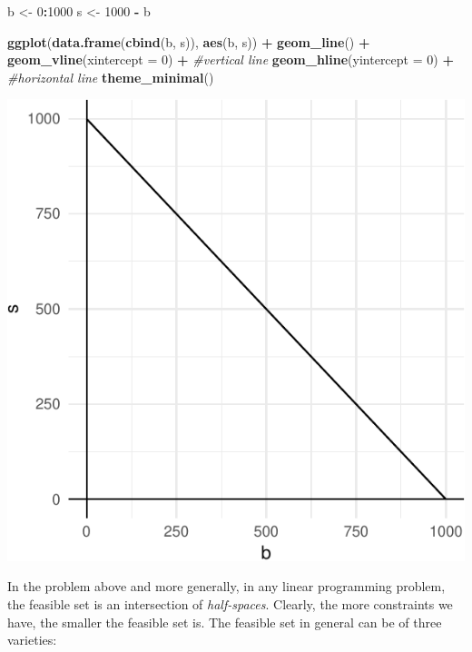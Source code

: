\documentclass[11pt,]{article}
\newenvironment{Shaded}{\begin{snugshade}}{\end{snugshade}}
\newcommand{\KeywordTok}[1]{\textcolor[rgb]{0.13,0.29,0.53}{\textbf{#1}}}
\newcommand{\DataTypeTok}[1]{\textcolor[rgb]{0.13,0.29,0.53}{#1}}
\newcommand{\DecValTok}[1]{\textcolor[rgb]{0.00,0.00,0.81}{#1}}
\newcommand{\StringTok}[1]{\textcolor[rgb]{0.31,0.60,0.02}{#1}}
\newcommand{\CommentTok}[1]{\textcolor[rgb]{0.56,0.35,0.01}{\textit{#1}}}
\newcommand{\OperatorTok}[1]{\textcolor[rgb]{0.81,0.36,0.00}{\textbf{#1}}}
\newcommand{\NormalTok}[1]{#1}
\begin{document}
\begin{Shaded}
\begin{Highlighting}[]
\NormalTok{b <-}\StringTok{ }\DecValTok{0}\OperatorTok{:}\DecValTok{1000}
\NormalTok{s <-}\StringTok{ }\DecValTok{1000} \OperatorTok{-}\StringTok{ }\NormalTok{b}

\KeywordTok{ggplot}\NormalTok{(}\KeywordTok{data.frame}\NormalTok{(}\KeywordTok{cbind}\NormalTok{(b, s)), }\KeywordTok{aes}\NormalTok{(b, s)) }\OperatorTok{+}
\StringTok{  }\KeywordTok{geom_line}\NormalTok{() }\OperatorTok{+}
\StringTok{  }\KeywordTok{geom_vline}\NormalTok{(}\DataTypeTok{xintercept =} \DecValTok{0}\NormalTok{) }\OperatorTok{+}\StringTok{ }\CommentTok{#vertical line}
\StringTok{  }\KeywordTok{geom_hline}\NormalTok{(}\DataTypeTok{yintercept =} \DecValTok{0}\NormalTok{) }\OperatorTok{+}\StringTok{ }\CommentTok{#horizontal line}
\StringTok{  }\KeywordTok{theme_minimal}\NormalTok{()}
\end{Highlighting}
\end{Shaded}

\includegraphics{Linear_Programming_files/figure-latex/plot_feasible-1.pdf}

In the problem above and more generally, in any linear programming
problem, the feasible set is an intersection of \emph{half-spaces}.
Clearly, the more constraints we have, the smaller the feasible set is.
The feasible set in general can be of three varieties:
\end{document}
